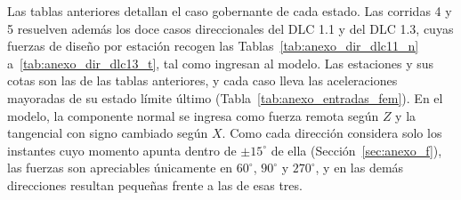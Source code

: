 Las tablas anteriores detallan el caso gobernante de cada estado. Las corridas 4 y 5
resuelven además los doce casos direccionales del DLC 1.1 y del DLC 1.3, cuyas fuerzas de
diseño por estación recogen las Tablas~\ref{tab:anexo_dir_dlc11_n}
a~\ref{tab:anexo_dir_dlc13_t}, tal como ingresan al modelo. Las estaciones y sus cotas son
las de las tablas anteriores, y cada caso lleva las aceleraciones mayoradas de su estado
límite último (Tabla~\ref{tab:anexo_entradas_fem}). En el modelo, la componente normal se
ingresa como fuerza remota según $Z$ y la tangencial con signo cambiado según $X$. Como
cada dirección considera solo los instantes cuyo momento apunta dentro de $\pm 15^\circ$
de ella (Sección~\ref{sec:anexo_f}), las fuerzas son apreciables únicamente en $60^\circ$,
$90^\circ$ y $270^\circ$, y en las demás direcciones resultan pequeñas frente a las de
esas tres.

